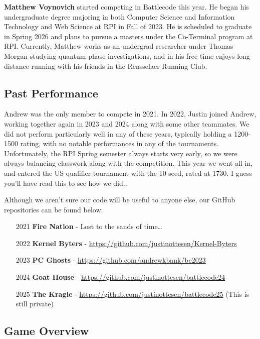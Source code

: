 \medskip

\textbf{Matthew Voynovich} started competing in Battlecode this year. He began his undergraduate degree majoring in both Computer Science and Information Technology and Web Science at RPI in Fall of 2023. He is scheduled to graduate in Spring 2026 and plans to pursue a masters under the Co-Terminal program at RPI. Currently, Matthew works as an undergrad researcher under Thomas Morgan studying quantum phase investigations, and in his free time enjoys long distance running with his friends in the Rensselaer Running Club.

\newpage
\subsection{Past Performance}

Andrew was the only member to compete in 2021. In 2022, Justin joined Andrew, working together again in 2023 and 2024 along with some other teammates. We did not perform particularly well in any of these years, typically holding a 1200-1500 rating, with no notable performances in any of the tournaments. Unfortunately, the RPI Spring semester always starts very early, so we were always balancing classwork along with the competition. This year we went all in, and entered the US qualifier tournament with the 10 seed, rated at 1730. I guess you'll have read this to see how we did...

\medskip

Although we aren't sure our code will be useful to anyone else, our GitHub repositories can be found below:
\begin{enumerate}
  \item[2021] \textbf{Fire Nation} - Lost to the sands of time\dots
  \item[2022] \textbf{Kernel Byters} - \url{https://github.com/justinottesen/Kernel-Byters}
  \item[2023] \textbf{PC Ghosts} - \url{https://github.com/andrewkbank/bc2023}
  \item[2024] \textbf{Goat House} - \url{https://github.com/justinottesen/battlecode24}
  \item[2025] \textbf{The Kragle} - \url{https://github.com/justinottesen/battlecode25} (This is still private)
\end{enumerate}

\subsection{Game Overview}

